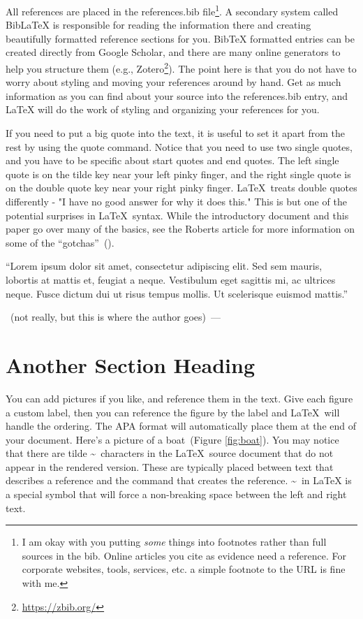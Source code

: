 \documentclass[12pt,man,hidelinks]{apa7}
\let\oldquote\quote
\let\endoldquote\endquote
\renewenvironment{quote}[2][]
  {\if\relax\detokenize{#1}\relax
     \def\quoteauthor{#2}%
  \else
     \def\quoteauthor{#2~---~#1}%
  \fi
  \oldquote}
  {\par\nobreak\smallskip\hfill\quoteauthor%
  \endoldquote\addvspace{\bigskipamount}}
\begin{document}
All references are placed in the references.bib file\footnote{I am okay with you putting \textit{some} things into footnotes rather than full sources in the bib. Online articles you cite as evidence need a reference. For corporate websites, tools, services, etc. a simple footnote to the URL is fine with me.}. A secondary system called BibLaTeX is responsible for reading the information there and creating beautifully formatted reference sections for you. BibTeX formatted entries can be created directly from Google Scholar, and there are many online generators to help you structure them (e.g., Zotero\footnote{\url{https://zbib.org/}}). The point here is that you do not have to worry about styling and moving your references around by hand. Get as much information as you can find about your source into the references.bib entry, and LaTeX will do the work of styling and organizing your references for you.

If you need to put a big quote into the text, it is useful to set it apart from the rest by using the quote command. Notice that you need to use two single quotes, and you have to be specific about start quotes and end quotes. The left single quote is on the tilde key near your left pinky finger, and the right single quote is on the double quote key near your right pinky finger. \LaTeX~treats double quotes differently - "I have no good answer for why it does this." This is but one of the potential surprises in \LaTeX~syntax. While the introductory document and this paper go over many of the basics, see the Roberts article for more information on some of the ``gotchas''~(\cite{Roberts}).

\begin{quote}{\cite{JCohen96}~(not really, but this is where the author goes)}
``Lorem ipsum dolor sit amet, consectetur adipiscing elit. Sed sem mauris, lobortis at mattis et, feugiat a neque. Vestibulum eget sagittis mi, ac ultrices neque. Fusce dictum dui ut risus tempus mollis. Ut scelerisque euismod mattis.''
\end{quote}

\section{Another Section Heading}

You can add pictures if you like, and reference them in the text. Give each figure a custom label, then you can reference the figure by the label and \LaTeX~will handle the ordering. The APA format will automatically place them at the end of your document. Here's a picture of a boat~(Figure \ref{fig:boat}). You may notice that there are tilde \textasciitilde~characters in the \LaTeX~source document that do not appear in the rendered version. These are typically placed between text that describes a reference and the command that creates the reference. \textasciitilde~in LaTeX is a special symbol that will force a non-breaking space between the left and right text.
\end{document}

